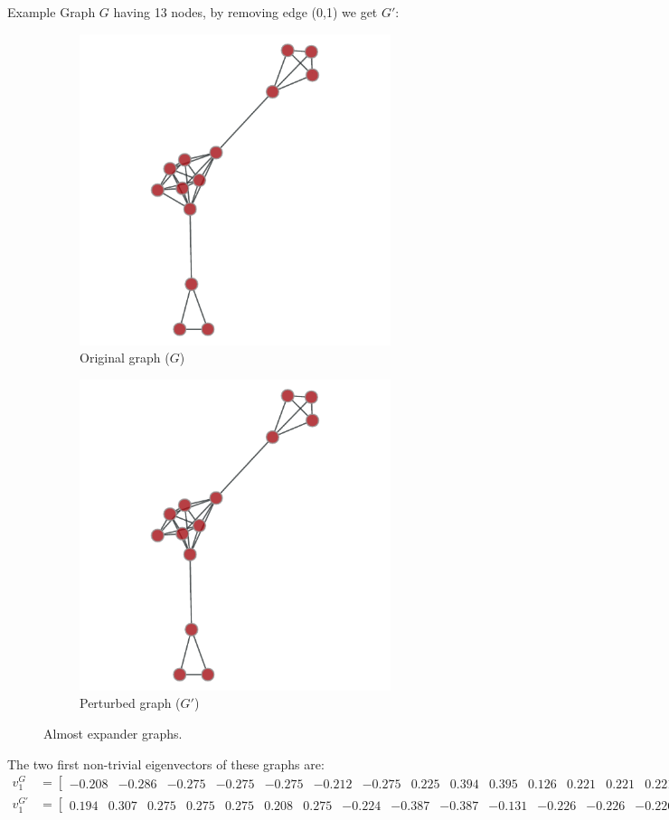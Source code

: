 \documentclass[handout]{beamer}
\begin{document}
    \begin{frame}{Example}
        Graph $G$ having 13 nodes, by removing edge (0,1) we get $G'$:
        \begin{figure}
        \centering
        \begin{subfigure}{.5\textwidth}
          \centering
          \includegraphics[width=.45\linewidth]{imgs/ex2_graph_13_full.pdf}
          \caption{Original graph ($G$)}
          \label{fig:ex2_graph_full}
        \end{subfigure}%
        \begin{subfigure}{.5\textwidth}
          \centering
          \includegraphics[width=.45\linewidth]{imgs/ex2_graph_13.pdf}
          \caption{Perturbed graph ($G'$)}
          \label{fig:ex2_graph_pert}
        \end{subfigure}
        \caption{Almost expander graphs.}
        \label{fig:ex2}
        \end{figure}
        The two first non-trivial eigenvectors of these graphs are:
        \tiny
        \begin{align*}
        v^G_1 &= 
             \begin{bmatrix} 
                -0.208 & -0.286 & -0.275 & -0.275 & -0.275 & -0.212 & -0.275 & 0.225 & 0.394 & 0.395 & 0.126 &  0.221 &  0.221 & 0.221 
             \end{bmatrix} \\            
        v^{G'}_1 &= 
             \begin{bmatrix} 
                0.194 & 0.307 & 0.275 & 0.275 & 0.275 & 0.208 & 0.275 & -0.224 & -0.387 & -0.387 & -0.131 & -0.226 & -0.226 & -0.226
             \end{bmatrix} \\
        \end{align*}
    \end{frame}
\end{document}
